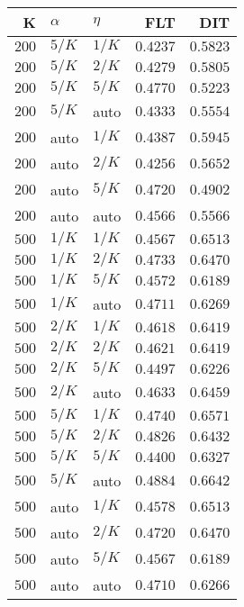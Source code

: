 \begin{table}
\begin{spacing}{1.2}
{\begin{tabular}{rll|rr}
\bottomrule
\end{tabular}
} \hfill \parbox{.45\linewidth}{\centering \begin{tabular}{rll|rr}
\toprule
    K &  $\alpha$ &    $\eta$ &           FLT &           DIT \\
\midrule
$200$ &  $5/K$ &  $1/K$ &      $0.4237$ &      $0.5823$ \\
$200$ &  $5/K$ &  $2/K$ &      $0.4279$ &      $0.5805$ \\
$200$ &  $5/K$ &  $5/K$ &      $0.4770$ &      $0.5223$ \\
$200$ &  $5/K$ &   auto &      $0.4333$ &      $0.5554$ \\
$200$ &   auto &  $1/K$ &      $0.4387$ &      $0.5945$ \\
$200$ &   auto &  $2/K$ &      $0.4256$ &      $0.5652$ \\
$200$ &   auto &  $5/K$ &      $0.4720$ &      $0.4902$ \\
$200$ &   auto &   auto &      $0.4566$ &      $0.5566$ \\
\myrowcolor $500$ &  $1/K$ &  $1/K$ &      $0.4567$ &      $0.6513$ \\
$500$ &  $1/K$ &  $2/K$ &      $0.4733$ &      $0.6470$ \\
$500$ &  $1/K$ &  $5/K$ &      $0.4572$ &      $0.6189$ \\
$500$ &  $1/K$ &   auto &      $0.4711$ &      $0.6269$ \\
$500$ &  $2/K$ &  $1/K$ &      $0.4618$ &      $0.6419$ \\
$500$ &  $2/K$ &  $2/K$ &      $0.4621$ &      $0.6419$ \\
$500$ &  $2/K$ &  $5/K$ &      $0.4497$ &      $0.6226$ \\
$500$ &  $2/K$ &   auto &      $0.4633$ &      $0.6459$ \\
$500$ &  $5/K$ &  $1/K$ &      $0.4740$ &      $0.6571$ \\
$500$ &  $5/K$ &  $2/K$ &      $0.4826$ &      $0.6432$ \\
$500$ &  $5/K$ &  $5/K$ &      $0.4400$ &      $0.6327$ \\
$500$ &  $5/K$ &   auto & $\bm{0.4884}$ & $\bm{0.6642}$ \\
$500$ &   auto &  $1/K$ &      $0.4578$ &      $0.6513$ \\
$500$ &   auto &  $2/K$ &      $0.4720$ &      $0.6470$ \\
$500$ &   auto &  $5/K$ &      $0.4567$ &      $0.6189$ \\
$500$ &   auto &   auto &      $0.4710$ &      $0.6266$ \\
\bottomrule
\end{tabular}
}
\end{spacing}
\end{table}

